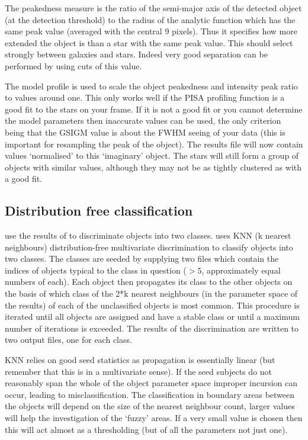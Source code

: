 The peakedness measure is the ratio of the semi-major axis of the
detected object (at the detection threshold) to the radius of the
analytic function which has the same peak value (averaged with the
central 9 pixels). Thus it specifies how more extended the object is
than a star with the same peak value. This should select strongly
between galaxies and stars. Indeed very good separation can be performed
by using cuts of this value.

The model profile is used to scale the object peakedness and intensity
peak ratio to values around one. This only works well if the PISA
profiling function is a good fit to the stars on your frame. If it is
not a good fit or you cannot determine the model parameters then
inaccurate values can be used, the only criterion being that the GSIGM
value is about the FWHM seeing of your data (this is important for
resampling the peak of the object). The results file will now contain
values `normalised' to this `imaginary' object. The stars will still
form a group of objects with similar values, although they may not be as
tightly clustered as with a good fit.

\subsection {Distribution free classification}

 use the results of  to discriminate
objects into two classes.  uses KNN (k nearest
neighbours) distribution-free multivariate discrimination to classify
objects into two classes. The classes are seeded by supplying two
files which contain the indices of objects typical to the class in
question ($>5$, approximately equal numbers of each). Each object then
propagates its class to the other objects on the basis of which class
of the 2*k nearest neighbours (in the parameter space of the
 results) of each of the unclassified objects is most
common. This procedure is iterated until all objects are assigned and
have a stable class or until a maximum number of iterations is
exceeded. The results of the discrimination are written to two output
files, one for each class.

KNN relies on good seed statistics as propagation is essentially linear
(but remember that this is in a multivariate sense). If the seed
subjects do not reasonably span the whole of the object parameter space
improper incursion can occur, leading to misclassification. The
classification in boundary areas between the objects will depend on the
size of the nearest neighbour count, larger values will help the
investigation of the `fuzzy' areas. If a very small value is chosen then
this will act almost as a thresholding (but of all the parameters not
just one).

